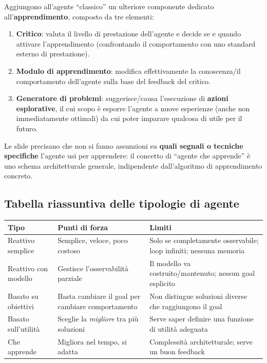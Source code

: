 \documentclass[11pt,a4paper]{report}
\begin{document}
Aggiungono all'agente ``classico'' un ulteriore componente dedicato all'\textbf{apprendimento}, composto da tre elementi:
\begin{enumerate}
  \item \textbf{Critico}: valuta il livello di prestazione dell'agente e decide se e quando attivare l'apprendimento (confrontando il comportamento con uno standard esterno di prestazione).
  \item \textbf{Modulo di apprendimento}: modifica effettivamente la conoscenza/il comportamento dell'agente sulla base del feedback del critico.
  \item \textbf{Generatore di problemi}: suggerisce/causa l'esecuzione di \textbf{azioni esplorative}, il cui scopo è esporre l'agente a nuove esperienze (anche non immediatamente ottimali) da cui poter imparare qualcosa di utile per il futuro.
\end{enumerate}

Le slide precisano che non si fanno assunzioni su \textbf{quali segnali o tecniche specifiche} l'agente usi per apprendere: il concetto di ``agente che apprende'' è uno schema architetturale generale, indipendente dall'algoritmo di apprendimento concreto.

\subsection{Tabella riassuntiva delle tipologie di agente}

\begin{center}
\small
\begin{tabular}{@{}p{2.6cm}p{4cm}p{4cm}@{}}
\toprule
\textbf{Tipo} & \textbf{Punti di forza} & \textbf{Limiti} \\
\midrule
Reattivo semplice & Semplice, veloce, poco costoso & Solo se completamente osservabile; loop infiniti; nessuna memoria \\
Reattivo con modello & Gestisce l'osservabilità parziale & Il modello va costruito/mantenuto; nessun goal esplicito \\
Basato su obiettivi & Basta cambiare il goal per cambiare comportamento & Non distingue soluzioni diverse che raggiungono il goal \\
Basato sull'utilità & Sceglie la \emph{migliore} tra più soluzioni & Serve saper definire una funzione di utilità adeguata \\
Che apprende & Migliora nel tempo, si adatta & Complessità architetturale; serve un buon feedback \\
\bottomrule
\end{tabular}
\normalsize
\end{center}
\end{document}
